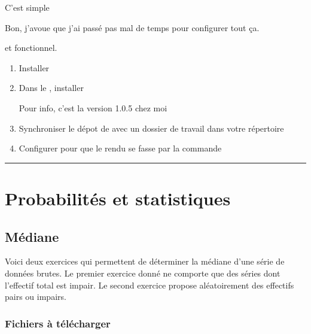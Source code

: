 \documentclass[letterpaper,10pt,french]{sphinxmanual}
\begin{document}
C’est  simple %
\begin{footnote}[1]\sphinxAtStartFootnote
Bon, j’avoue que j’ai passé pas mal de temps pour configurer tout ça.
%
\end{footnote} et fonctionnel.
\begin{enumerate}
\item {} 
Installer 

\item {} 
Dans le , installer  %
\begin{footnote}[2]\sphinxAtStartFootnote
Pour info, c’est la version 1.0.5 chez moi
%
\end{footnote}

\item {} 
Synchroniser le dépot de  avec un dossier de travail dans votre répertoire

\item {} 
Configurer  pour que le rendu se fasse par la commande 

\end{enumerate}


\bigskip\hrule\bigskip



\chapter{Probabilités et statistiques}
\label{\detokenize{index:probabilites-et-statistiques}}

\section{Médiane}
\label{\detokenize{proba stat - mediane:mediane}}\label{\detokenize{proba stat - mediane::doc}}
Voici deux exercices qui permettent de déterminer la médiane d’une série
de données brutes.
Le premier exercice donné ne comporte que des séries dont l’effectif total
est impair. Le second exercice propose aléatoirement des effectifs pairs
ou impairs.



\subsection{Fichiers à télécharger}
\label{\detokenize{proba stat - mediane:fichiers-a-telecharger}}
\end{document}
